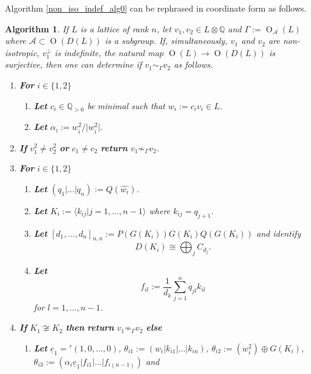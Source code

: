 \documentclass[12pt, a4paper]{article}
\newtheorem{algo}{Algorithm}[section]
\newcommand{\QQ}{\mathbb{Q}}
\newcommand{\la}{\langle}
\newcommand{\ra}{\rangle}
\newcommand{\beq}{\begin{equation*}}
\newcommand{\eeq}{\end{equation*}}
\newcommand{\Ac}{\mathcal{A}}
\newcommand{\opn}{\operatorname}
\newcommand{\op}{\oplus}
\begin{document}
Algorithm \ref{non_iso_indef_alg0} can be rephrased in coordinate form as follows.
\begin{algo}\label{non_iso_indef_alg}
  If $L$ is a lattice of rank $n$,
  let $v_1, v_2 \in L \otimes \QQ$  and
  $\Gamma:=\opn{O}_{\Ac}(L)$ where $\Ac \subset \opn{O}(D(L))$ is a subgroup.
  If, simultaneously, 
$v_1$ and $v_2$ are non-isotropic,
  $v_1^{\perp}$ is indefinite, 
  the natural map $\opn{O}(L) \rightarrow \opn{O}(D(L))$ is surjective, 
then one can determine if $v_1 \sim_{\Gamma} v_2$ as follows. 
  \begin{enumerate}
  \item \textbf{For} $i \in \{1,2\}$  \label{NIIA1}
    \begin{enumerate}
    \item \textbf{Let} $c_i \in \QQ_{>0}$ be minimal such that $w_i:=c_i v_i \in L$.
    \item \textbf{Let} $\alpha_i := w_i^2 / \vert w_i^2 \vert$.
    \end{enumerate}
  \item \textbf{If} $v_1 ^2 \neq v_2^2$ \textbf{or} $c_1 \neq c_2$ \textbf{return} $v_1 \not \sim_{\Gamma} v_2$. \label{NIIA2}
  \item \textbf{For} $i \in \{1,2\}$ \label{NIIA3} 
    \begin{enumerate}
\item \textbf{Let} $(q_1 \vert \ldots \vert q_n ):=Q(\hat{w_i})$.
    \item \textbf{Let} $K_i:= \la k_{ij} \vert j=1, \ldots, n-1 \ra$ where $k_{ij}=q_{j+1}$.
    \item \textbf{Let}
      $[d_1, \ldots, d_n]_{n,n}:=P(G(K_i)) G(K_i) Q(G(K_i))$ and identify
\begin{equation}\label{DKcanonical}
D(K_i) \cong \bigoplus_j C_{d_j}.
\end{equation}
    \item \textbf{Let}
\beq
      f_{il} := \frac{1}{d_k} \sum_{j=1}^n q_{jl} k_{il}  
      \eeq
for $l=1, \ldots, n-1$.
    \end{enumerate} 
  \item \textbf{If} $K_1 \not \cong K_2$ \textbf{then} \label{NIIA4}
    \textbf{return} $v_1 \not \sim_{\Gamma} v_2$ \textbf{else} 
    \begin{enumerate}
    \item \textbf{Let}
      $\underline{e}_1 = {}^{\tau}(1, 0, \ldots, 0)$, 
      $\theta_{i1} := (w_i \vert k_{i1} \vert \ldots \vert k_{in} )$, 
      $\theta_{i2} := (w_i^2) \op G(K_i)$, 
      $\theta_{i3} := (\alpha_i \underline{e}_1 \vert f_{i1} \vert \ldots \vert f_{i(n-1)})$ and

\end{enumerate}
\end{enumerate}
\end{algo}
\end{document}
